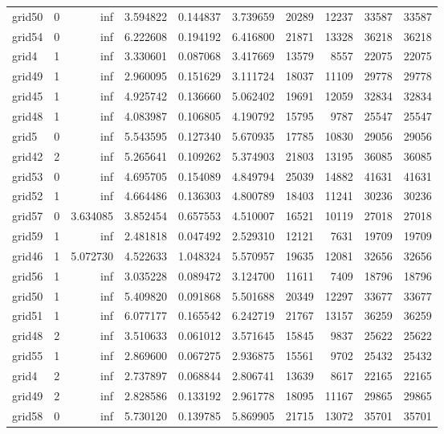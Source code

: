 \begin{longtable}{|l|r|r|r|r|r|r|r|r|r|}
grid50 & 0 & inf & 3.594822 & 0.144837 & 3.739659 & 20289 & 12237 & 33587 & 33587 \\
grid54 & 0 & inf & 6.222608 & 0.194192 & 6.416800 & 21871 & 13328 & 36218 & 36218 \\
grid4 & 1 & inf & 3.330601 & 0.087068 & 3.417669 & 13579 & 8557 & 22075 & 22075 \\
grid49 & 1 & inf & 2.960095 & 0.151629 & 3.111724 & 18037 & 11109 & 29778 & 29778 \\
grid45 & 1 & inf & 4.925742 & 0.136660 & 5.062402 & 19691 & 12059 & 32834 & 32834 \\
grid48 & 1 & inf & 4.083987 & 0.106805 & 4.190792 & 15795 & 9787 & 25547 & 25547 \\
grid5 & 0 & inf & 5.543595 & 0.127340 & 5.670935 & 17785 & 10830 & 29056 & 29056 \\
grid42 & 2 & inf & 5.265641 & 0.109262 & 5.374903 & 21803 & 13195 & 36085 & 36085 \\
grid53 & 0 & inf & 4.695705 & 0.154089 & 4.849794 & 25039 & 14882 & 41631 & 41631 \\
grid52 & 1 & inf & 4.664486 & 0.136303 & 4.800789 & 18403 & 11241 & 30236 & 30236 \\
grid57 & 0 & 3.634085 & 3.852454 & 0.657553 & 4.510007 & 16521 & 10119 & 27018 & 27018 \\
grid59 & 1 & inf & 2.481818 & 0.047492 & 2.529310 & 12121 & 7631 & 19709 & 19709 \\
grid46 & 1 & 5.072730 & 4.522633 & 1.048324 & 5.570957 & 19635 & 12081 & 32656 & 32656 \\
grid56 & 1 & inf & 3.035228 & 0.089472 & 3.124700 & 11611 & 7409 & 18796 & 18796 \\
grid50 & 1 & inf & 5.409820 & 0.091868 & 5.501688 & 20349 & 12297 & 33677 & 33677 \\
grid51 & 1 & inf & 6.077177 & 0.165542 & 6.242719 & 21767 & 13157 & 36259 & 36259 \\
grid48 & 2 & inf & 3.510633 & 0.061012 & 3.571645 & 15845 & 9837 & 25622 & 25622 \\
grid55 & 1 & inf & 2.869600 & 0.067275 & 2.936875 & 15561 & 9702 & 25432 & 25432 \\
grid4 & 2 & inf & 2.737897 & 0.068844 & 2.806741 & 13639 & 8617 & 22165 & 22165 \\
grid49 & 2 & inf & 2.828586 & 0.133192 & 2.961778 & 18095 & 11167 & 29865 & 29865 \\
grid58 & 0 & inf & 5.730120 & 0.139785 & 5.869905 & 21715 & 13072 & 35701 & 35701 \\

\end{longtable}
